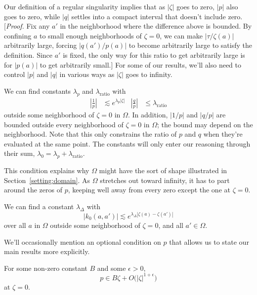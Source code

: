\documentclass{article}
\makeatletter
\theoremstyle{plain}
\newcommand{\condconst}[2]{\item[($\text{\textsc{#1}} \mid #2$)]\protected@edef\@currentlabel{$\text{\textsc{#1}} \mid #2$}}
\newcommand{\hardker}{k_0}
\newcommand{\domain}{\Omega}
\newenvironment{verify}{\color{ForestGreen}}{\color{black}}
\makeatother
\begin{document}
Our definition of a regular singularity implies that as $|\zeta|$ goes to zero, $|p|$ also goes to zero, while $|q|$ settles into a compact interval that doesn't include zero.
\begin{verify}
[\textit{Proof.} Fix any $a'$ in the neighborhood where the difference above is bounded. By confining $a$ to small enough neighborhoods of $\zeta = 0$, we can make $|\tau/\zeta(a)|$ arbitrarily large, forcing $|q(a')/p(a)|$ to become arbitrarily large to satisfy the definition. Since $a'$ is fixed, the only way for this ratio to get arbitrarily large is for $|p(a)|$ to get arbitrarily small.]
\end{verify}
For some of our results, we'll also need to control $|p|$ and $|q|$ in various ways as $|\zeta|$ goes to infinity.
\begin{conditions}
\condconst{slow}{\lambda_0}\label{cond:slow} We can find constants $\lambda_p$ and $\lambda_\text{ratio}$ with
\begin{align*}
\left|\frac{1}{p}\right| & \lesssim e^{\lambda_p |\zeta|} &
\left|\frac{q}{p}\right| & \le \lambda_\text{ratio}
\end{align*}
outside some neighborhood of $\zeta = 0$ in $\domain$. In addition, $|1/p|$ and $|q/p|$ are bounded outside every neighborhood of $\zeta = 0$ in $\domain$; the bound may depend on the neighborhood. Note that this only constrains the ratio of $p$ and $q$ when they're evaluated at the same point. The constants will only enter our reasoning through their sum, $\lambda_0 = \lambda_p + \lambda_\text{ratio}$.
\end{conditions}
This condition explains why $\domain$ might have the sort of shape illustrated in Section~\ref{setting:domain}. As $\domain$ stretches out toward infinity, it has to part around the zeros of $p$, keeping well away from every zero except the one at $\zeta = 0$.
\begin{conditions}
\condconst{diag$_0$}{\lambda_\Delta}\label{cond:diag-basic} We can find a constant $\lambda_\Delta$ with
\[ \big| \hardker(a, a') \big| \lesssim e^{\lambda_\Delta|\zeta(a)-\zeta(a')|} \]
over all $a$ in $\domain$ outside some neighborhood of $\zeta = 0$, and all $a' \in \domain$.
\end{conditions}
We'll occasionally mention an optional condition on $p$ that allows us to state our main results more explicitly.
\begin{conditions}
\condconst{reg-p}{B, \epsilon}\label{cond:reg-p}
For some non-zero constant $B$ and some $\epsilon > 0$,
\[ p \in B\zeta + O\big(|\zeta|^{1 + \epsilon}\big) \]
at $\zeta = 0$.
\end{conditions}
\end{document}
